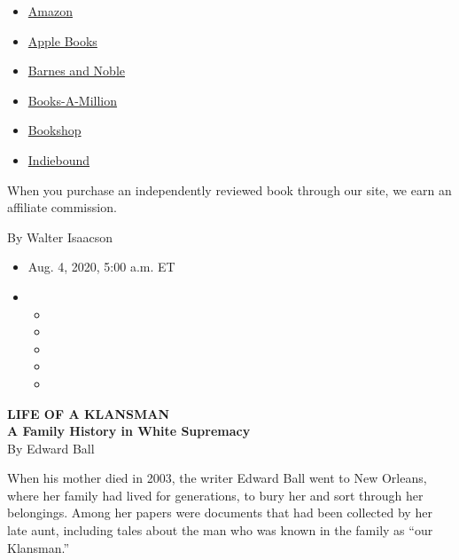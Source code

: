 \begin{itemize}
\tightlist
\item
  \href{https://www.amazon.com/gp/search?index=books\&tag=NYTBSREV-20\&field-keywords=Life+of+a+Klansman\%3A+A+Family+History+in+White+Supremacy+Edward+Ball}{Amazon}
\item
  \href{https://du-gae-books-dot-nyt-du-prd.appspot.com/buy?title=Life+of+a+Klansman\%3A+A+Family+History+in+White+Supremacy\&author=Edward+Ball}{Apple
  Books}
\item
  \href{https://www.anrdoezrs.net/click-7990613-11819508?url=https\%3A\%2F\%2Fwww.barnesandnoble.com\%2Fw\%2F\%3Fean\%3D9780374186326}{Barnes
  and Noble}
\item
  \href{https://www.anrdoezrs.net/click-7990613-35140?url=https\%3A\%2F\%2Fwww.booksamillion.com\%2Fp\%2FLife\%2Bof\%2Ba\%2BKlansman\%253A\%2BA\%2BFamily\%2BHistory\%2Bin\%2BWhite\%2BSupremacy\%2FEdward\%2BBall\%2F9780374186326}{Books-A-Million}
\item
  \href{https://bookshop.org/a/3546/9780374186326}{Bookshop}
\item
  \href{https://www.indiebound.org/book/9780374186326?aff=NYT}{Indiebound}
\end{itemize}

When you purchase an independently reviewed book through our site, we
earn an affiliate commission.

By Walter Isaacson

\begin{itemize}
\item
  Aug. 4, 2020, 5:00 a.m. ET
\item
  \begin{itemize}
  \item
  \item
  \item
  \item
  \item
  \end{itemize}
\end{itemize}

\textbf{LIFE OF A KLANSMAN}\\
\textbf{A Family History in White Supremacy}\\
By Edward Ball

When his mother died in 2003, the writer Edward Ball went to New
Orleans, where her family had lived for generations, to bury her and
sort through her belongings. Among her papers were documents that had
been collected by her late aunt, including tales about the man who was
known in the family as ``our Klansman.''

